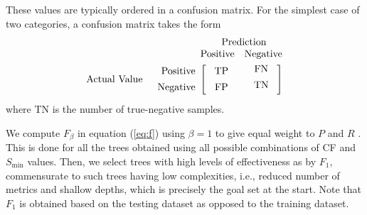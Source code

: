 These values are typically ordered in a confusion matrix. For the simplest case of two categories, a confusion matrix takes the form
%
\begin{equation}
\nonumber
\begin{array}{rr@{}rl}
	&					&	\multicolumn{2}{c}{\mathrm{Prediction}}		\\
	&					&	\mathrm{Positive}	&	\mathrm{Negative}	\\[0.75ex]
	\mathrm{Actual~Value}
	&	\begin{array}{r}
			\mathrm{Positive} \\[1ex]
			\mathrm{Negative}
		\end{array}
	&	\left[~
		\begin{array}{c}
			\mathrm{TP} \\[1ex]
			\mathrm{FP}
		\end{array}\right.
	&
		\left.
		\begin{array}{cc}
			~\mathrm{FN} \\[1ex]
			~\mathrm{TN} \\[1ex]
		\end{array}~\right]
\end{array}
\end{equation}
%
where TN is the number of true-negative samples. 

We compute $F_{\beta}$ in equation (\ref{eq:f}) using $\beta = 1$ to give equal weight to $P$ and $R$ \citep{McCarthy_1995_Proc}. This is done for all the trees obtained using all possible combinations of CF and $S_{\min}$ values. Then, we select trees with high levels of effectiveness as  by $F_1$, commensurate to such trees having low complexities, i.e., reduced number of metrics and shallow depths, which is precisely the goal set at the start. Note that $F_1$ is obtained based on the testing dataset as opposed to the training dataset. 

